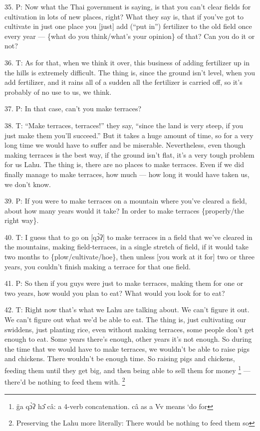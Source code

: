 35. P: Now what the Thai government is saying, is that you can't clear fields for
cultivation in lots of new places, right? What they say is, that if you've got
to cultivate in just one place you [just] add (``put in'') fertilizer to the old
field once every year --- \{what do you think/what's your opinion\} of that? Can
you do it or not?

36. T: As for that, when we think it over, this business of adding fertilizer up
in the hills is extremely difficult. The thing is, since the ground isn't level,
when you add fertilizer, and it rains all of a sudden all the fertilizer is carried
off, so it's probably of no use to us, we think.

37. P: In that case, can't you make terraces?

38. T: ``Make terraces, terraces!'' they say, ``since the land is very steep, if
you just make them you'll succeed.'' But it takes a huge amount of time, so for
a very long time we would have to suffer and be miserable. Nevertheless, even though
making terraces is the best way, if the ground isn't flat, it's a very tough problem
for us Lahu. The thing is, there are no places to make terraces. Even if we did
finally manage to make terraces, how much --- how long it would have taken us,
we don't know.

39. P: If you were to make terraces on a mountain where you've cleared a field,
about how many years would it take? In order to make terraces \{properly/the right
way\}.

40. T: I guess that to go on [qɔ̀ʔ] to make terraces in a field that we've cleared
in the mountains, making field-terraces, in a single stretch of field, if it would
take two months to \{plow/cultivate/hoe\}, then unless [you work at it for] two
or three years, you couldn't finish making a terrace for that one field.

41. P: So then if you guys were just to make terraces, making them for one or two
years, how would you plan to eat? What would you look for to eat?

42. T: Right now that's what we Lahu are talking about. We can't figure it out.
We can't figure out what we'd be able to eat. The thing is, just cultivating our
swiddens, just planting rice, even without making terraces, some people don't get
enough to eat. Some years there's enough, other years it's not enough. So during
the time that we would have to make terraces, we wouldn't be able to raise pigs
and chickens. There wouldn't be enough time. So raising pigs and chickens, feeding
them until they get big, and then being able to sell them for money \footnote{g̈a qɔ̀ʔ hɔ̂ câ: a 4-verb concatenation. câ as a Vv means `do for} --- there'd
be nothing to feed them with. \footnote{Preserving the Lahu more literally: There would be nothing to feed them so}


